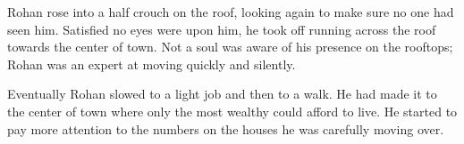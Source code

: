 \documentclass[ms,a4paper]{memoir}
\begin{document}
Rohan rose into a half crouch on the roof, looking again to make sure no one had seen 
him. Satisfied no eyes were upon him, he took off running across the roof towards the
center of town. Not a soul was aware of his presence on the rooftops; Rohan was an 
expert at moving quickly and silently.

Eventually Rohan slowed to a light job and then to a walk. He had made it to the center 
of town where only the most wealthy could afford to live. He started to pay more attention 
to the numbers on the houses he was carefully moving over.
\end{document}
